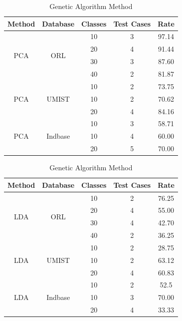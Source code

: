\documentclass[conference]{IEEEtran}
\begin{document}
    \begin{table}[htbp!]
    \small %
    \centering
    \setlength{\tabcolsep}{6pt} %
    \renewcommand{\arraystretch}{2.2} %
    \begin{tabular}{|c|c|c|c|c|}
    \hline
    Method & Database & Classes & Test Cases & Rate \\ \hline
    \multirow{4}{*}{PCA} & \multirow{4}{*}{ORL} & 10 & 3 & 97.14 \\
    & & 20 & 4 & 91.44 \\
    & & 30 & 3 & 87.60 \\
    & & 40 & 2 & 81.87 \\ \hline
    \multirow{3}{*}{PCA} & \multirow{3}{*}{UMIST} & 10 & 2 & 73.75 \\
    & & 10 & 2 & 70.62 \\
    & & 20 & 4 & 84.16 \\ \hline
    \multirow{3}{*}{PCA} & \multirow{3}{*}{Indbase} & 10 & 3 & 58.71 \\
    & & 10 & 4 & 60.00 \\
    & & 20 & 5 & 70.00 \\ \hline
    \end{tabular}
    
    
    \caption{Genetic Algorithm Method}
    \end{table}

    \begin{table}[htbp!]
    \small %
    \centering
    \setlength{\tabcolsep}{6pt} %
    \renewcommand{\arraystretch}{2.2} %
    \begin{tabular}{|c|c|c|c|c|}
    \hline
    Method & Database & Classes & Test Cases & Rate \\ \hline
    \multirow{4}{*}{LDA} & \multirow{4}{*}{ORL} & 10 & 2 & 76.25 \\
    & & 20 & 4 & 55.00 \\
    & & 30 & 4 & 42.70 \\
    & & 40 & 2 & 36.25 \\ \hline
    \multirow{3}{*}{LDA} & \multirow{3}{*}{UMIST} & 10 & 2 & 28.75 \\
    & & 10 & 2 & 63.12 \\
    & & 20 & 4 & 60.83 \\ \hline
    \multirow{3}{*}{LDA} & \multirow{3}{*}{Indbase} & 10 & 2 & 52.5 \\
    & & 10 & 3 & 70.00 \\
    & & 20 & 4 & 33.33 \\ \hline
    \end{tabular}
    
    \caption{Genetic Algorithm Method}
    \end{table}
\end{document}
